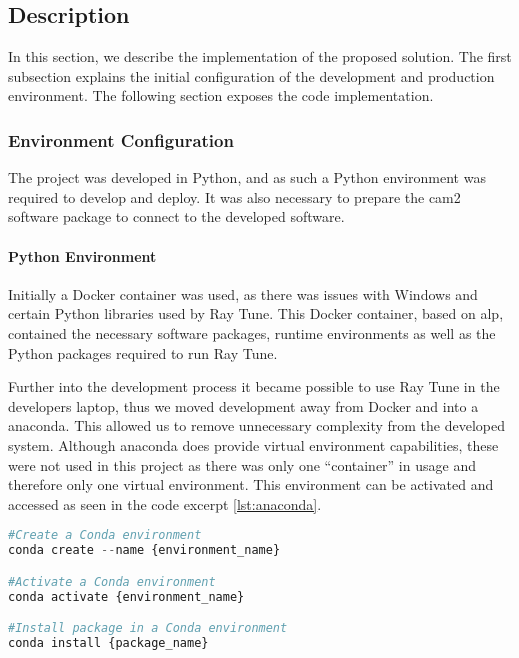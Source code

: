 
\subsection{Description}

In this section, we describe the implementation of the proposed solution. The first subsection explains the initial configuration of the development and production environment. The following section exposes the code implementation.

\subsubsection{Environment Configuration}

The project was developed in Python, and as such a Python environment was required to develop and deploy. It was also necessary to prepare the \acrshort{cam2} software package to connect to the developed software.

\paragraph{Python Environment}

Initially a Docker container was used, as there was issues with Windows and certain Python libraries used by Ray Tune. This Docker container, based on \acrfull{alp}, contained the necessary software packages, runtime environments as well as the Python packages required to run Ray Tune.

Further into the development process it became possible to use Ray Tune in the developers laptop, thus we moved development away from Docker and into a \acrfull{anaconda}. This allowed us to remove unnecessary complexity from the developed system. Although \acrshort{anaconda} does provide virtual environment capabilities, these were not used in this project as there was only one ``container'' in usage and therefore only one virtual environment. This environment can be activated and accessed as seen in the code excerpt \ref{lst:anaconda}.

\begin{lstlisting}[language=Python, caption=Managing a Conda environment, captionpos=b, label={lst:anaconda}]
#Create a Conda environment
conda create --name {environment_name}

#Activate a Conda environment
conda activate {environment_name}

#Install package in a Conda environment
conda install {package_name}
\end{lstlisting}

